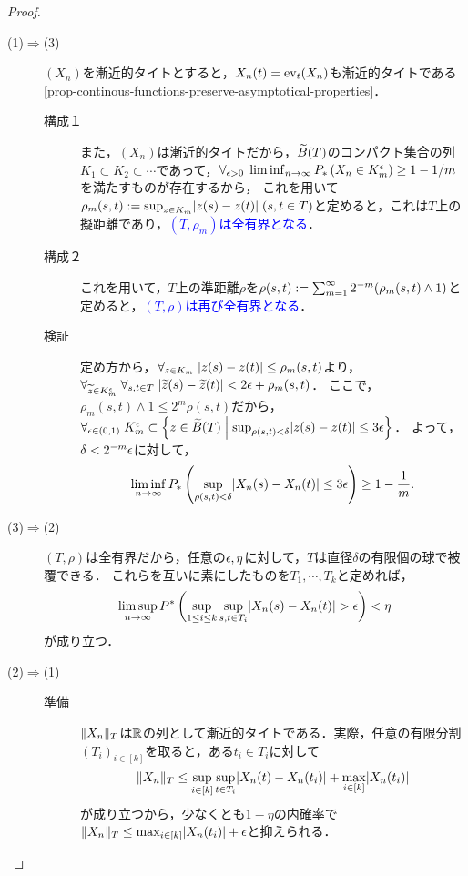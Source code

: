 \documentclass[uplatex,dvipdfmx]{jsreport}
\begin{document}
\begin{proof}\mbox{}
    \begin{description}
        \item[(1)$\Rightarrow$(3)] 
        $(X_n)$を漸近的タイトとすると，$X_n(t)=\mathrm{ev}_t(X_n)$も漸近的タイトである\ref{prop-continous-functions-preserve-asymptotical-properties}．
        \begin{description}
            \item[構成１] また，$(X_n)$は漸近的タイトだから，$\widetilde{B}(T)$のコンパクト集合の列$K_1\subset K_2\subset\cdots$であって，$\forall_{\epsilon>0}\;\liminf_{n\to\infty} P_*\left(X_n\in K^\epsilon_m\right)\ge 1-1/m$を満たすものが存在するから，
            これを用いて$\rho_m(s,t):=\sup_{z\in K_m}\lvert z(s)-z(t)\rvert\;(s,t\in T)$と定めると，これは$T$上の擬距離であり，\textcolor{blue}{$(T,\rho_m)$は全有界となる}．
            \item[構成２] 
            これを用いて，$T$上の準距離$\rho$を$\rho(s,t):=\sum_{m=1}^\infty 2^{-m}(\rho_m(s,t)\land 1)$と定めると，\textcolor{blue}{$(T,\rho)$は再び全有界となる}．
            \item[検証] 
            定め方から，$\forall_{z\in K_m}\;\lvert z(s)-z(t)\rvert\le\rho_m(s,t)$より，$\forall_{\widetilde{z}\in K_m^\epsilon}\;\forall_{s,t\in T}\;\lvert\widetilde{z}(s)-\widetilde{z}(t)\rvert<2\epsilon+\rho_m(s,t)$．
            ここで，$\rho_m(s,t)\land 1\le 2^m\rho(s,t)$だから，$\forall_{\epsilon\in(0,1)}\;K^\epsilon_m\subset\left\{z\in\widetilde{B}(T)\;\middle|\;\sup_{\rho(s,t)<\delta}\lvert z(s)-z(t)\rvert\le 3\epsilon\right\}$．
            よって，$\delta<2^{-m}\epsilon$に対して，
            \[\liminf_{n\to\infty} P_*\left(\sup_{\rho(s,t)<\delta}\lvert X_n(s)-X_n(t)\rvert\le 3\epsilon\right)\ge 1-\frac{1}{m}.\]
        \end{description}
        \item[(3)$\Rightarrow$(2)]
        $(T,\rho)$は全有界だから，任意の$\epsilon,\eta$に対して，$T$は直径$\delta$の有限個の球で被覆できる．
        これらを互いに素にしたものを$T_1,\cdots,T_k$と定めれば，
        \[\limsup_{n\to\infty} P^*\left(\sup_{1\le i\le k}\sup_{s,t\in T_i}\lvert X_n(s)-X_n(t)\rvert>\epsilon\right)<\eta\]
        が成り立つ．
        \item[(2)$\Rightarrow$(1)]
        \begin{description}
            \item[準備] $\|X_n\|_T$は$\mathbb{R}$の列として漸近的タイトである．実際，任意の有限分割$(T_i)_{i\in[k]}$を取ると，ある$t_i\in T_i$に対して
            \[\|X_n\|_T\le\sup_{i\in[k]}\sup_{t\in T_i}\lvert X_n(t)-X_n(t_i)\rvert+\max_{i\in[k]}\lvert X_n(t_i)\rvert\]
            が成り立つから，少なくとも$1-\eta$の内確率で$\|X_n\|_T\le\max_{i\in[k]}\lvert X_n(t_i)\rvert+\epsilon$と抑えられる．


\end{description}
\end{description}
\end{proof}
\end{document}
